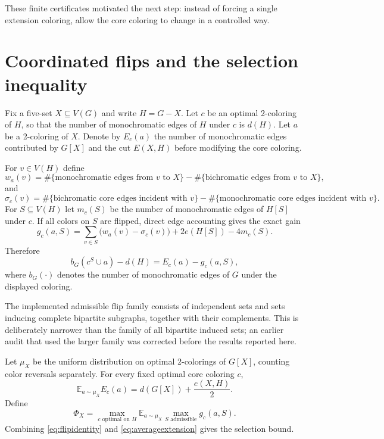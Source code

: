 \documentclass[11pt]{article}
\newcommand{\dd}{d}
\newcommand{\E}{\mathbb{E}}
\begin{document}
These finite certificates motivated the next step: instead of forcing a
single extension coloring, allow the core coloring to change in a
controlled way.

\section{Coordinated flips and the selection inequality}
\label{sec:flips}

Fix a five-set $X\subseteq V(G)$ and write $H=G-X$.  Let $c$ be an optimal
2-coloring of $H$, so that the number of monochromatic edges of $H$ under
$c$ is $\dd(H)$.  Let $a$ be a 2-coloring of $X$.  Denote by $E_c(a)$ the
number of monochromatic edges contributed by $G[X]$ and the cut
$E(X,H)$ before modifying the core coloring.

For $v\in V(H)$ define
\[
w_a(v)=
\#\{\text{monochromatic edges from $v$ to $X$}\}
-
\#\{\text{bichromatic edges from $v$ to $X$}\},
\]
and
\[
\sigma_c(v)=
\#\{\text{bichromatic core edges incident with $v$}\}
-
\#\{\text{monochromatic core edges incident with $v$}\}.
\]
For $S\subseteq V(H)$ let $m_c(S)$ be the number of monochromatic edges
of $H[S]$ under $c$.  If all colors on $S$ are flipped, direct edge
accounting gives the exact gain
\[
g_c(a,S)=
\sum_{v\in S}\bigl(w_a(v)-\sigma_c(v)\bigr)
+2e(H[S])-4m_c(S).
\]
Therefore
\begin{equation}
 b_G(c^S\cup a)-\dd(H)=E_c(a)-g_c(a,S),
 \label{eq:flipidentity}
\end{equation}
where $b_G(\cdot)$ denotes the number of monochromatic edges of $G$ under
the displayed coloring.

The implemented admissible flip family consists of independent sets and
sets inducing complete bipartite subgraphs, together with their
complements.  This is deliberately narrower than the family of all
bipartite induced sets; an earlier audit that used the larger family was
corrected before the results reported here.

Let $\mu_X$ be the uniform distribution on optimal 2-colorings of $G[X]$,
counting color reversals separately.  For every fixed optimal core coloring
$c$,
\begin{equation}
\E_{a\sim\mu_X} E_c(a)
=
\dd(G[X])+\frac{e(X,H)}{2}.
\label{eq:averageextension}
\end{equation}
Define
\[
\Phi_X=
\max_{c\text{ optimal on }H}
\E_{a\sim\mu_X}
\max_{S\text{ admissible}} g_c(a,S).
\]
Combining \eqref{eq:flipidentity} and \eqref{eq:averageextension} gives the
selection bound.
\end{document}
